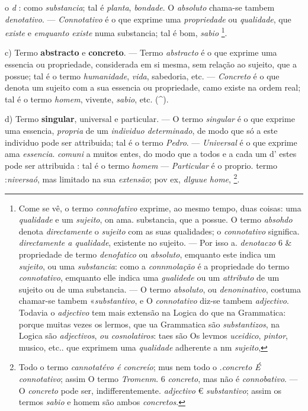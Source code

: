 o \emph{d} : como \emph{substancia}; tal é \emph{planta}, \emph{bondade}. O \emph{absoluto} chama-se tambem \emph{denotativo}. --- \emph{Connotativo} é o que exprime uma \emph{propriedade} ou \emph{qualidade}, que \emph{existe} e \emph{emquanto existe} numa substancia; tal é bom, \emph{sabio} \footnote{Come se vê, o termo \emph{connofativo} exprime, ao mesmo tempo, duas coisas: uma \emph{qualidade} e um \emph{sujeito}, on ama. substancia, que a possue. O termo \emph{absohdo} denota \emph{directamente} o \emph{sujeito} com as suas qualidades; o \emph{connotativo} significa. \emph{directamente a qualidade}, existente no sujeito. --- Por isso a. \emph{denotaczo} 6 \& propriedade de termo \emph{denofatico} ou \emph{absoluto}, emquanto este indica um \emph{sujeito}, ou uma \emph{substancia}: como a \emph{connmolação} é a propriedade do termo \emph{connotativo}, emquanto elle indica uma \emph{gualidede} ou um \emph{attributo} de um sujeito ou de uma substancia. --- O termo \emph{absoluto}, ou \emph{denoninativo}, costuma chamar-se tambem «\emph{substantivo}, e O \emph{connotativo} diz-se tambem \emph{adjectivo}. Todavia o \emph{adjectivo} tem mais extensão na Logica do que na Grammatica: porque muitas vezes os lermos, que ua Grammatica são \emph{substantizos}, na Logica são \emph{adjectivos}, \emph{ou cosnolatiros}: taes são Os levmos \emph{uceidico}, \emph{pintor}, musico, etc.. que exprimem uma \emph{qualidade} adherente a nm \emph{sujeito},}.

c) Termo \textbf{abstracto} e \textbf{concreto}. --- Termo \emph{abstracto} é o que exprime uma essencia ou propriedade, considerada em si mesma, sem relação ao sujeito, que a possue; tal é o termo \emph{humanidade}, \emph{vida}, sabedoria, etc. --- \emph{Concreto} é o que denota um sujeito com a sua essencia ou propriedade, camo existe na ordem real; tal é o termo \emph{homem}, vivente, \emph{sabio}, etc. (\textasciicircum{}).

d) Termo \textbf{singular}, universal e particular. --- O termo \emph{singular} é o que exprime uma essencia, \emph{propria} de um \emph{individuo determinado}, de modo que só a este individuo pode ser attribuida; tal é o termo \emph{Pedro}. --- \emph{Universal} é o que exprime ama \emph{essencia}. \emph{comuni} a muitos entes, do modo que a todos e a cada um d' estes pode ser attribuida : tal é o termo \emph{homem} --- \emph{Particular} é o proprio. termo :\emph{niversaó}, mas limitado na sua \emph{extensão}; pov ex, \emph{dlguue home}, \footnote{Todo o termo \emph{cannotatévo é concreío}; mus nem todo o .\emph{concreto É connotativo}; assim O termo \emph{Tromenm}. 6 \emph{concreto}, mas não é \emph{connobativo}. --- O \emph{concreto} pode ser, indifferentemente. \emph{adjectivo} € \emph{substantivo}; assim os termos \emph{sabio} e homem são ambos \emph{concretos}.}.

